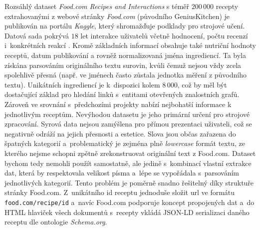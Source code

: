 Rozsáhlý dataset \emph{Food.com Recipes and Interactions} s téměř $200\,000$ recepty extrahovanými z webové stránky \emph{Food.com} (původního GeniusKitchen) je publikován na portálu \emph{Kaggle}, který shromažďuje podklady pro strojové učení. Datová sada pokrývá $18$ let interakce uživatelů včetně hodnocení, počtu recenzí i~konkrétních reakcí \citep{shuyang_li_2019}. Kromě základních informací obsahuje také nutriční hodnoty receptů, datum publikování a rovněž normalizovaná jména ingrediencí. Ta byla získána parsováním originálního textu surovin, kvůli čemuž nejsou vždy zcela spolehlivě přesná (např. ve jménech často zůstala jednotka měření z původního textu). Unikátních ingrediencí je k~dispozici kolem $8\,000$, což by měl být dostačující základ pro hledání linků s~entitami otevřených znalostních grafů. Zároveň ve srovnání s~předchozími projekty nabízí nejbohatší informace k jednotlivým receptům. Nevýhodou datasetu je jeho primární určení pro strojové zpracování. Syrová data nejsou zamýšlena pro přímou prezentaci uživateli, což se negativně odráží na jejich přesnosti a estetice. Slova jsou občas zařazena do špatných kategorií a~problematický je zejména plně \emph{lowercase} formát textu, ze kterého nejsme schopni zpětně zrekonstruovat originální text z Food.com. Dataset bychom tedy nemohli použít samostatně, ale jedině s~kombinací vlastní extrakce dat, která by respektovala velikost písma a~lépe se vypořádala s~parsováním jednotlivých kategorií.
Tento problém je poměrně snadno řešitelný díky struktuře stránky Food.com. Z~unikátního id receptu jednoduše složit url ve formátu \texttt{food.com/recipe/id} a~navíc Food.com podporuje koncept propojených dat a~do HTML hlaviček všech dokumentů s~recepty vkládá JSON-LD serializaci daného receptu dle ontologie \emph{Schema.org}.

